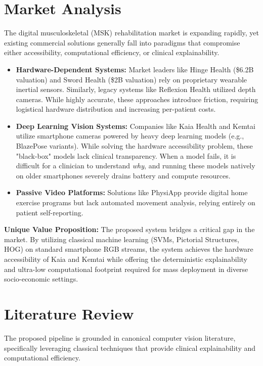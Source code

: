 \documentclass[10pt, twocolumn, a4paper]{article}
\begin{document}
\section{Market Analysis}
The digital musculoskeletal (MSK) rehabilitation market is expanding rapidly, yet existing commercial solutions generally fall into paradigms that compromise either accessibility, computational efficiency, or clinical explainability.

\begin{itemize}
    \item \textbf{Hardware-Dependent Systems:} Market leaders like Hinge Health (\$6.2B valuation) and Sword Health (\$2B valuation) rely on proprietary wearable inertial sensors. Similarly, legacy systems like Reflexion Health utilized depth cameras. While highly accurate, these approaches introduce friction, requiring logistical hardware distribution and increasing per-patient costs.
    \item \textbf{Deep Learning Vision Systems:} Companies like Kaia Health and Kemtai utilize smartphone cameras powered by heavy deep learning models (e.g., BlazePose variants). While solving the hardware accessibility problem, these "black-box" models lack clinical transparency. When a model fails, it is difficult for a clinician to understand \textit{why}, and running these models natively on older smartphones severely drains battery and compute resources.
    \item \textbf{Passive Video Platforms:} Solutions like PhysiApp provide digital home exercise programs but lack automated movement analysis, relying entirely on patient self-reporting.
\end{itemize}

\textbf{Unique Value Proposition:} The proposed system bridges a critical gap in the market. By utilizing classical machine learning (SVMs, Pictorial Structures, HOG) on standard smartphone RGB streams, the system achieves the hardware accessibility of Kaia and Kemtai while offering the deterministic explainability and ultra-low computational footprint required for mass deployment in diverse socio-economic settings.


\section{Literature Review}
The proposed pipeline is grounded in canonical computer vision literature, specifically leveraging classical techniques that provide clinical explainability and computational efficiency.
\end{document}
